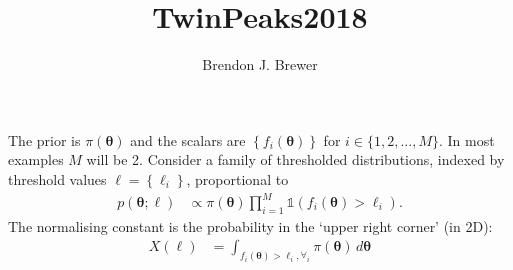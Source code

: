 \documentclass[a4paper, 12pt]{article}
\title{TwinPeaks2018}
\author{Brendon J. Brewer}
\newcommand{\bell}{\boldsymbol{\ell}}
\newcommand{\btheta}{\boldsymbol{\theta}}
\begin{document}
\maketitle


\setlength{\parindent}{0pt}
\setlength{\parskip}{8pt}

The prior is $\pi(\btheta)$ and the scalars are
$\left\{ f_i(\btheta) \right\}$
for $i \in \{1, 2, ..., M\}$. In most examples $M$ will be 2.
Consider a family of thresholded distributions, indexed by threshold
values $\bell=\left\{\ell_i\right\}$, proportional to
\begin{align}
p(\btheta; \bell) &\propto
    \pi(\btheta)
    \prod_{i=1}^M \mathds{1}\left(f_i(\btheta) > \ell_i\right).
\end{align}
The normalising constant is the probability in the `upper right corner'
(in 2D):
\begin{align}
X(\bell) &= \int_{f_i(\btheta) > \ell_i, \forall_i} \pi(\btheta) \, d\btheta
\end{align}
\end{document}
